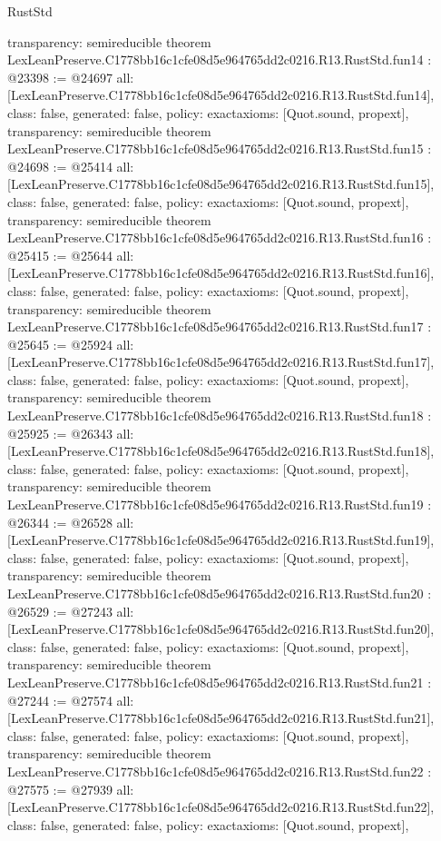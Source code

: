 \begin{lexlean}{RustStd}
\begin{coremodule}
{  transparency: semireducible
}
theorem LexLeanPreserve.C1778bb16c1cfe08d5e964765dd2c0216.R13.RustStd.fun14 : @23398 := @24697 {
  all: [LexLeanPreserve.C1778bb16c1cfe08d5e964765dd2c0216.R13.RustStd.fun14],
  class: false,
  generated: false,
  policy: exact{axioms: [Quot.sound, propext]},
  transparency: semireducible
}
theorem LexLeanPreserve.C1778bb16c1cfe08d5e964765dd2c0216.R13.RustStd.fun15 : @24698 := @25414 {
  all: [LexLeanPreserve.C1778bb16c1cfe08d5e964765dd2c0216.R13.RustStd.fun15],
  class: false,
  generated: false,
  policy: exact{axioms: [Quot.sound, propext]},
  transparency: semireducible
}
theorem LexLeanPreserve.C1778bb16c1cfe08d5e964765dd2c0216.R13.RustStd.fun16 : @25415 := @25644 {
  all: [LexLeanPreserve.C1778bb16c1cfe08d5e964765dd2c0216.R13.RustStd.fun16],
  class: false,
  generated: false,
  policy: exact{axioms: [Quot.sound, propext]},
  transparency: semireducible
}
theorem LexLeanPreserve.C1778bb16c1cfe08d5e964765dd2c0216.R13.RustStd.fun17 : @25645 := @25924 {
  all: [LexLeanPreserve.C1778bb16c1cfe08d5e964765dd2c0216.R13.RustStd.fun17],
  class: false,
  generated: false,
  policy: exact{axioms: [Quot.sound, propext]},
  transparency: semireducible
}
theorem LexLeanPreserve.C1778bb16c1cfe08d5e964765dd2c0216.R13.RustStd.fun18 : @25925 := @26343 {
  all: [LexLeanPreserve.C1778bb16c1cfe08d5e964765dd2c0216.R13.RustStd.fun18],
  class: false,
  generated: false,
  policy: exact{axioms: [Quot.sound, propext]},
  transparency: semireducible
}
theorem LexLeanPreserve.C1778bb16c1cfe08d5e964765dd2c0216.R13.RustStd.fun19 : @26344 := @26528 {
  all: [LexLeanPreserve.C1778bb16c1cfe08d5e964765dd2c0216.R13.RustStd.fun19],
  class: false,
  generated: false,
  policy: exact{axioms: [Quot.sound, propext]},
  transparency: semireducible
}
theorem LexLeanPreserve.C1778bb16c1cfe08d5e964765dd2c0216.R13.RustStd.fun20 : @26529 := @27243 {
  all: [LexLeanPreserve.C1778bb16c1cfe08d5e964765dd2c0216.R13.RustStd.fun20],
  class: false,
  generated: false,
  policy: exact{axioms: [Quot.sound, propext]},
  transparency: semireducible
}
theorem LexLeanPreserve.C1778bb16c1cfe08d5e964765dd2c0216.R13.RustStd.fun21 : @27244 := @27574 {
  all: [LexLeanPreserve.C1778bb16c1cfe08d5e964765dd2c0216.R13.RustStd.fun21],
  class: false,
  generated: false,
  policy: exact{axioms: [Quot.sound, propext]},
  transparency: semireducible
}
theorem LexLeanPreserve.C1778bb16c1cfe08d5e964765dd2c0216.R13.RustStd.fun22 : @27575 := @27939 {
  all: [LexLeanPreserve.C1778bb16c1cfe08d5e964765dd2c0216.R13.RustStd.fun22],
  class: false,
  generated: false,
  policy: exact{axioms: [Quot.sound, propext]},
}
\end{coremodule}
\end{lexlean}
